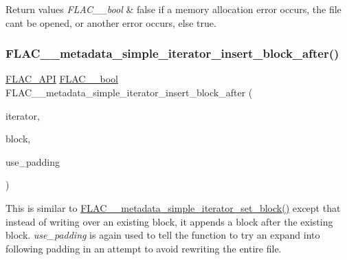 \begin{DoxyRetVals}{Return values}
{\em F\+L\+A\+C\+\_\+\+\_\+bool} & {\ttfamily false} if a memory allocation error occurs, the file can\textquotesingle{}t be opened, or another error occurs, else {\ttfamily true}. \\
\hline
\end{DoxyRetVals}
\mbox{\label{group__flac__metadata__level1_ga1239ccc5ae1dc3f7cb0e1a61707fafc6}} 
\subsubsection{\texorpdfstring{FLAC\_\_metadata\_simple\_iterator\_insert\_block\_after()}{FLAC\_\_metadata\_simple\_iterator\_insert\_block\_after()}}
{\footnotesize\ttfamily \mbox{\hyperlink{group__flac__export_ga56ca07df8a23310707732b1c0007d6f5}{F\+L\+A\+C\+\_\+\+A\+PI}} \mbox{\hyperlink{ordinals_8h_a95103469f1cbd78b8cf250194985b34e}{F\+L\+A\+C\+\_\+\+\_\+bool}} F\+L\+A\+C\+\_\+\+\_\+metadata\+\_\+simple\+\_\+iterator\+\_\+insert\+\_\+block\+\_\+after (\begin{DoxyParamCaption}\item[{\mbox{\hyperlink{group__flac__metadata__level1_ga6accccddbb867dfc2eece9ee3ffecb3a}{F\+L\+A\+C\+\_\+\+\_\+\+Metadata\+\_\+\+Simple\+Iterator}} $\ast$}]{iterator,  }\item[{\mbox{\hyperlink{struct_f_l_a_c_____stream_metadata}{F\+L\+A\+C\+\_\+\+\_\+\+Stream\+Metadata}} $\ast$}]{block,  }\item[{\mbox{\hyperlink{ordinals_8h_a95103469f1cbd78b8cf250194985b34e}{F\+L\+A\+C\+\_\+\+\_\+bool}}}]{use\+\_\+padding }\end{DoxyParamCaption})}

This is similar to \mbox{\hyperlink{group__flac__metadata__level1_ga7d1ceb2db292c968ae6ac18ecb15c356}{F\+L\+A\+C\+\_\+\+\_\+metadata\+\_\+simple\+\_\+iterator\+\_\+set\+\_\+block()}} except that instead of writing over an existing block, it appends a block after the existing block. {\itshape use\+\_\+padding} is again used to tell the function to try an expand into following padding in an attempt to avoid rewriting the entire file.

